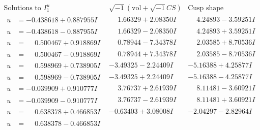 \documentclass[1p]{elsarticle_modified}
\theoremstyle{definition}
\newcommand{\I}{\sqrt{-1}}
\begin{document}
$$\begin{array}{c|c|c}  
\text{Solutions to }I^u_{1}& \I (\text{vol} + \sqrt{-1}CS) & \text{Cusp shape}\\
 \hline 
\begin{aligned}
u &= -0.438618 + 0.887955 I\end{aligned}
 & \phantom{-}1.66329 + 2.08350 I & \phantom{-}4.24893 - 3.59251 I \\ \hline\begin{aligned}
u &= -0.438618 - 0.887955 I\end{aligned}
 & \phantom{-}1.66329 - 2.08350 I & \phantom{-}4.24893 + 3.59251 I \\ \hline\begin{aligned}
u &= \phantom{-}0.500467 + 0.918869 I\end{aligned}
 & \phantom{-}0.78944 - 7.34378 I & \phantom{-}2.03585 + 8.70536 I \\ \hline\begin{aligned}
u &= \phantom{-}0.500467 - 0.918869 I\end{aligned}
 & \phantom{-}0.78944 + 7.34378 I & \phantom{-}2.03585 - 8.70536 I \\ \hline\begin{aligned}
u &= \phantom{-}0.598969 + 0.738905 I\end{aligned}
 & -3.49325 - 2.24409 I & -5.16388 + 4.25877 I \\ \hline\begin{aligned}
u &= \phantom{-}0.598969 - 0.738905 I\end{aligned}
 & -3.49325 + 2.24409 I & -5.16388 - 4.25877 I \\ \hline\begin{aligned}
u &= -0.039909 + 0.910777 I\end{aligned}
 & \phantom{-}3.76737 + 2.61939 I & \phantom{-}8.11481 - 3.60921 I \\ \hline\begin{aligned}
u &= -0.039909 - 0.910777 I\end{aligned}
 & \phantom{-}3.76737 - 2.61939 I & \phantom{-}8.11481 + 3.60921 I \\ \hline\begin{aligned}
u &= \phantom{-}0.638378 + 0.466853 I\end{aligned}
 & -0.63403 + 3.08008 I & -2.04297 - 2.82964 I \\ \hline\begin{aligned}
u &= \phantom{-}0.638378 - 0.466853 I\end{aligned}

\end{array}$$
\end{document}
